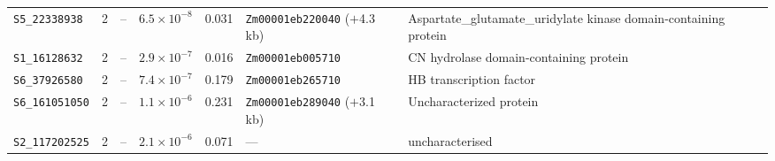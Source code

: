 \begin{table}[t]
\begin{tabularx}{\textwidth}{@{}l c c r r l >{\raggedright\arraybackslash}X@{}}
\texttt{S5\_22338938} & 2 & -- & $6.5\times10^{-8}$ & 0.031 & \texttt{Zm00001eb220040} ($+$4.3 kb) & Aspartate\_glutamate\_uridylate kinase domain-containing protein \\
\texttt{S1\_16128632} & 2 & -- & $2.9\times10^{-7}$ & 0.016 & \texttt{Zm00001eb005710} & CN hydrolase domain-containing protein \\
\texttt{S6\_37926580} & 2 & -- & $7.4\times10^{-7}$ & 0.179 & \texttt{Zm00001eb265710} & HB transcription factor \\
\texttt{S6\_161051050} & 2 & -- & $1.1\times10^{-6}$ & 0.231 & \texttt{Zm00001eb289040} ($+$3.1 kb) & Uncharacterized protein \\
\texttt{S2\_117202525} & 2 & -- & $2.1\times10^{-6}$ & 0.071 & --- & uncharacterised \\
\hline
\end{tabularx}
\end{table}
